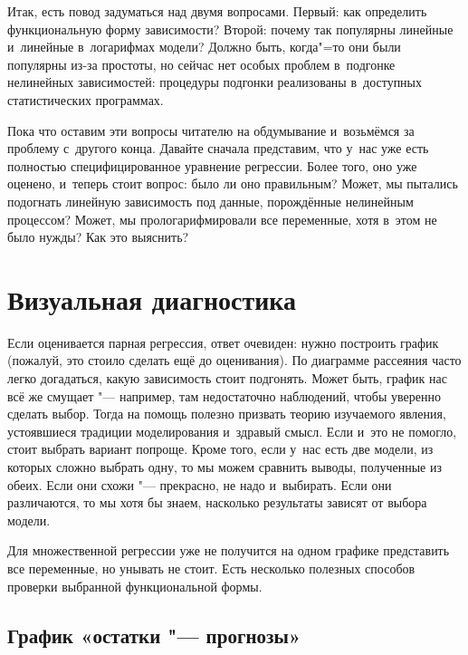 \documentclass[final,pdftex]{../../template/epsilonj}
\begin{document}
Итак, есть повод задуматься над двумя вопросами. Первый: как определить функциональную форму зависимости? Второй: почему так популярны линейные и~линейные в~логарифмах модели? Должно быть, когда"=то они были популярны из-за простоты, но сейчас нет особых проблем в~подгонке нелинейных зависимостей: процедуры подгонки реализованы в~доступных статистических программах.

Пока что оставим эти вопросы читателю на обдумывание и~возьмёмся за проблему с~другого конца. Давайте сначала представим, что у~нас уже есть полностью специфицированное уравнение регрессии. Более того, оно уже оценено, и~теперь стоит вопрос: было ли оно правильным? Может, мы пытались подогнать линейную зависимость под данные, порождённые нелинейным процессом? Может, мы прологарифмировали все переменные, хотя в~этом не было нужды? Как это выяснить?

\section{Визуальная диагностика}

Если оценивается парная регрессия, ответ очевиден: нужно построить график (пожалуй, это стоило сделать ещё до оценивания). По диаграмме рассеяния часто легко догадаться, какую зависимость стоит подгонять. Может быть, график нас всё же смущает "--- например, там недостаточно наблюдений, чтобы уверенно сделать выбор. Тогда на помощь полезно призвать теорию изучаемого явления, устоявшиеся традиции моделирования и~здравый смысл. Если и~это не помогло, стоит выбрать вариант попроще. Кроме того, если у~нас есть две модели, из которых сложно выбрать одну, то мы можем сравнить выводы, полученные из обеих. Если они схожи "--- прекрасно, не надо и~выбирать. Если они различаются, то мы хотя бы знаем, насколько результаты зависят от выбора модели.

Для множественной регрессии уже не получится на одном графике представить все переменные, но унывать не стоит. Есть несколько полезных способов проверки выбранной функциональной формы.

\subsection{График «остатки "--- прогнозы»}
\end{document}
